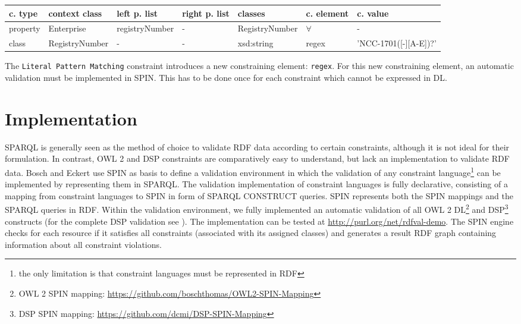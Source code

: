 \documentclass{llncs}
\newcommand{\ms}[1]{\texttt{#1}}
\newenvironment{gcotable}{
  \scriptsize
  \sffamily
  \vspace{0.3cm}
	\begin{center}
  \begin{tabular}{l|l|l|l|l|l|l}
  \hline
  \textbf{c. type} & \textbf{context class} & \textbf{left p. list} & \textbf{right p. list} & \textbf{classes} & \textbf{c. element} & \textbf{c. value} \\
  \hline

}{
  \hline
  \end{tabular}
	\end{center}
}
\begin{document}
\begin{gcotable}
property & Enterprise & registryNumber & - & RegistryNumber & $\forall$ & - \\
class & RegistryNumber & - & - & xsd:string & regex & 'NCC-1701([-][A-E])?' \\
\end{gcotable}

The \ms{Literal Pattern Matching} constraint introduces a new constraining element: \ms{regex}.
For this new constraining element, an automatic validation must be implemented in SPIN.
This has to be done once for each constraint which cannot be expressed in DL.

\section{Implementation}

SPARQL is generally seen as the method of choice to validate RDF data according to certain constraints, although it is not ideal for their formulation. 
In contrast, OWL 2 and DSP constraints are comparatively easy to understand, but lack an implementation to validate RDF data. 
Bosch and Eckert\cite{BoschEckert2014-2} use SPIN as basis to define a
validation environment in which the validation of any constraint language\footnote{the only limitation is that constraint languages must be represented in RDF} can be implemented by representing them in SPARQL. 
The validation implementation of constraint languages is fully declarative,
consisting of a mapping from constraint languages to SPIN in form of SPARQL CONSTRUCT queries.
SPIN represents both the SPIN mappings and the SPARQL queries in RDF. 
Within the validation environment, we fully implemented an automatic validation of all OWL 2 DL\footnote{OWL 2 SPIN mapping: \url{https://github.com/boschthomas/OWL2-SPIN-Mapping}} and DSP\footnote{DSP SPIN mapping: \url{https://github.com/dcmi/DSP-SPIN-Mapping}} constructs (for the complete DSP validation see \cite{BoschEckert2014-2}). 
The implementation can be tested at \url{http://purl.org/net/rdfval-demo}.
The SPIN engine checks for each resource if it satisfies all constraints (associated with its assigned classes) and generates a result RDF graph containing information about all constraint violations.
\end{document}
